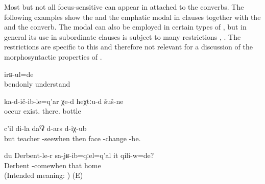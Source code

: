 Most but not all focus-sensitive  can appear in  attached to the converbs. The following examples show the    and the emphatic modal   in clauses together with the  and the  converb. The modal   can also be employed in certain types of , but in general its use in subordinate clauses is subject to many restrictions , . The restrictions are specific to this  and therefore not relevant for a discussion of the morphosyntactic properties of .
%
\begin{exe}
	\ex	\label{ex:‎‎‎I understood (everything) only wrongly)}
	\gll	[b-alk'-un-ne=cun]	irʁ-ul=de\\
		bendonly	understand\\
	\glt	{}

	\ex	\label{ex:Fallen down there are bottles there}
	\gll	ka-d-ič-ib-le=q'ar	χe-d	heχtːu-d	šuš-ne\\
		occur	exist.	there.	bottle\\
	\glt	{}

	
		\ex	\label{But when I saw the teacher, my face changed (i.e. turned red)}
		\gll	[a	učitil	či-w-až-ib=qːel=q'al]	c'il	di-la	daˁʡ d-ars	d-iχ-ub\\
			but	teacher	-seewhen	then		face \tsc{npl}-change 	-be.	\\
		\glt	{} 
	
		\ex	\label{ex:‎‎‎Was he at home when I came back from Derbent@B}
		\gll	{*} 	du		Derbent-le-r	sa-jʁ-ib=qːel=q'al	it	qili-w=de?\\
			{}		Derbent	-comewhen	that	home	\\
		\glt	(Intended meaning: ) (E)

\end{exe}

